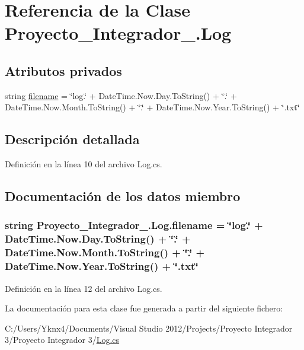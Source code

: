 \hypertarget{class_proyecto___integrador__3_1_1_log}{\section{Referencia de la Clase Proyecto\-\_\-\-Integrador\-\_.\-Log}
\label{class_proyecto___integrador__3_1_1_log}
}
\subsection*{Atributos privados}
\begin{DoxyCompactItemize}
\item 
string \hyperlink{class_proyecto___integrador__3_1_1_log_af2e0edbff8720c667fa803a0c370d175}{filename} = \char`\"{}log.\char`\"{} + Date\-Time.\-Now.\-Day.\-To\-String() + \char`\"{}.\char`\"{} + Date\-Time.\-Now.\-Month.\-To\-String() + \char`\"{}.\char`\"{} + Date\-Time.\-Now.\-Year.\-To\-String() + \char`\"{}.txt\char`\"{}
\end{DoxyCompactItemize}


\subsection{Descripción detallada}


Definición en la línea 10 del archivo Log.\-cs.



\subsection{Documentación de los datos miembro}
\hypertarget{class_proyecto___integrador__3_1_1_log_af2e0edbff8720c667fa803a0c370d175}{
\subsubsection[{filename}]{\setlength{\rightskip}{0pt plus 5cm}string Proyecto\-\_\-\-Integrador\-\_.\-Log.\-filename = \char`\"{}log.\char`\"{} + Date\-Time.\-Now.\-Day.\-To\-String() + \char`\"{}.\char`\"{} + Date\-Time.\-Now.\-Month.\-To\-String() + \char`\"{}.\char`\"{} + Date\-Time.\-Now.\-Year.\-To\-String() + \char`\"{}.txt\char`\"{}\hspace{0.3cm}{\ttfamily [private]}}}\label{class_proyecto___integrador__3_1_1_log_af2e0edbff8720c667fa803a0c370d175}


Definición en la línea 12 del archivo Log.\-cs.



La documentación para esta clase fue generada a partir del siguiente fichero\-:\begin{DoxyCompactItemize}
\item 
C\-:/\-Users/\-Yknx4/\-Documents/\-Visual Studio 2012/\-Projects/\-Proyecto Integrador 3/\-Proyecto Integrador 3/\hyperlink{_log_8cs}{Log.\-cs}\end{DoxyCompactItemize}

